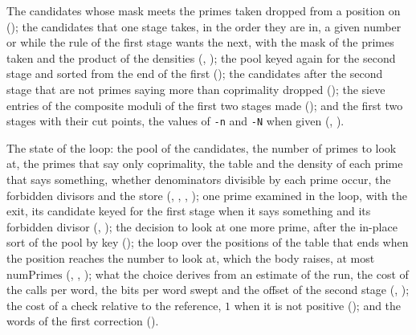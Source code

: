 \begin{definition}\label{def:firstStages}
  \leanok
  The candidates whose mask meets the primes taken dropped from a position on
  (); the candidates that one stage takes, in the order they are
  in, a given number or while the rule of the first stage wants the next, with the mask of the
  primes taken and the product of the densities (,
  ); the pool keyed again for the second stage and sorted from
  the end of the first (); the candidates after the second stage
  that are not primes saying more than coprimality dropped ();
  the sieve entries of the composite moduli of the first two stages made
  (); and the first two stages with their cut points, the values
  of \verb|-n| and \verb|-N| when given (,
  ).
\end{definition}

\begin{definition}\label{def:tablesLoop}
  \leanok
  The state of the loop: the pool of the candidates, the number of primes to look at, the primes
  that say only coprimality, the table and the density of each prime that says something, whether
  denominators divisible by each prime occur, the forbidden divisors and the store
  (, ,
  , ); one prime examined in
  the loop, with the exit, its candidate keyed for the first stage when it says something and its
  forbidden divisor (, ); the
  decision to look at one more prime, after the in-place sort of the pool by key
  (); the loop over the positions of the table that ends when the
  position reaches the number to look at, which the body raises, at most $\mathrm{numPrimes}$
  (, ,
  ); what the choice derives from an estimate of the run, the
  cost of the calls per word, the bits per word swept and the offset of the second stage
  (, ); the cost of a check
  relative to the reference, $1$ when it is not positive (); and
  the words of the first correction ().
\end{definition}

